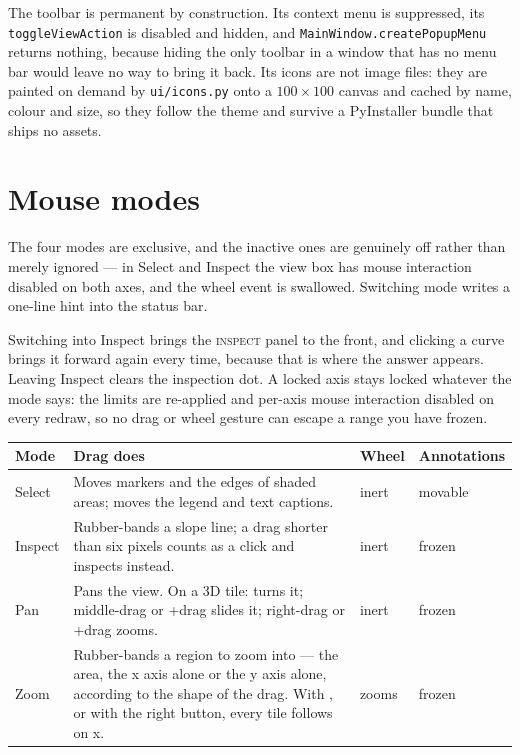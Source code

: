 \documentclass[11pt,a4paper,oneside]{report}
\newcommand{\code}[1]{\texttt{#1}}
\newcommand{\key}[1]{\textsf{\small\fbox{#1}}}
\newcommand{\tab}[1]{\textsc{#1}}
\begin{document}
The toolbar is permanent by construction. Its context menu is suppressed, its
\code{toggleViewAction} is disabled and hidden, and
\code{MainWindow.createPopupMenu} returns nothing, because hiding the only
toolbar in a window that has no menu bar would leave no way to bring it back.
Its icons are not image files: they are painted on demand by
\code{ui/icons.py} onto a $100\times100$ canvas and cached by name, colour and
size, so they follow the theme and survive a PyInstaller bundle that ships no
assets.

\section{Mouse modes}

The four modes are exclusive, and the inactive ones are genuinely off rather
than merely ignored --- in Select and Inspect the view box has mouse interaction
disabled on both axes, and the wheel event is swallowed. Switching mode writes a
one-line hint into the status bar.

Switching into Inspect brings the \tab{inspect} panel to the front, and clicking
a curve brings it forward again every time, because that is where the answer
appears. Leaving Inspect clears the inspection dot. A locked axis stays locked
whatever the mode says: the limits are re-applied and per-axis mouse interaction
disabled on every redraw, so no drag or wheel gesture can escape a range you have
frozen.

\begin{center}
\small
\begin{tabular}{@{}p{}p{}p{}p{}@{}}
\toprule
\textbf{Mode} & \textbf{Drag does} & \textbf{Wheel} & \textbf{Annotations} \\
\midrule
Select & Moves markers and the edges of shaded areas; moves the legend and text captions. & inert & movable \\
Inspect & Rubber-bands a slope line; a drag shorter than six pixels counts as a click and inspects instead. & inert & frozen \\
Pan & Pans the view. On a 3D tile: turns it; middle-drag or \key{Shift}+drag slides it; right-drag or \key{Ctrl}+drag zooms. & inert & frozen \\
Zoom & Rubber-bands a region to zoom into --- the area, the x axis alone or the y axis alone, according to the shape of the drag. With \key{Ctrl}, or with the right button, every tile follows on x. & zooms & frozen \\
\bottomrule
\end{tabular}
\end{center}
\end{document}
